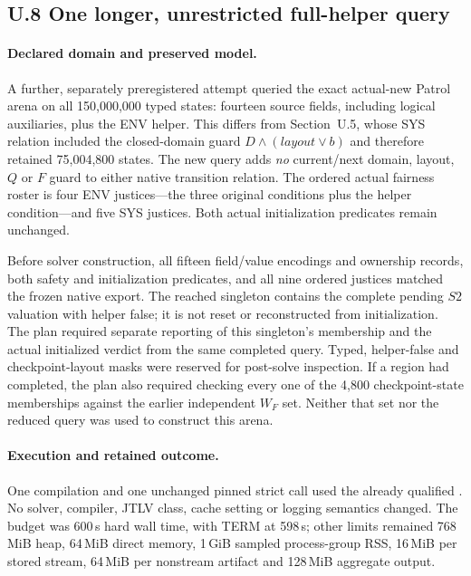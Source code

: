 \subsection*{U.8 One longer, unrestricted full-helper query}
\label{supp:native-full-helper-extended}

\paragraph{Declared domain and preserved model.}
A further, separately preregistered attempt queried the exact actual-new
Patrol arena on all 150,000,000 typed states: fourteen source fields,
including logical auxiliaries, plus the ENV helper. This differs from
Section~U.5, whose SYS relation included the closed-domain guard
$D\land(\mathit{layout}\lor b)$ and therefore retained 75,004,800 states.
The new query adds \emph{no} current/next domain, layout, $Q$ or $F$
guard to either native transition relation. The ordered actual fairness
roster is four ENV justices---the three original conditions plus the
helper condition---and five SYS justices. Both actual initialization
predicates remain unchanged.

Before solver construction, all fifteen field/value encodings and
ownership records, both safety and initialization predicates, and all
nine ordered justices matched the frozen native export. The reached
singleton contains the complete pending $S2$ valuation with helper false;
it is not reset or reconstructed from initialization. The plan required
separate reporting of this singleton's membership and the actual
initialized verdict from the same completed query. Typed, helper-false
and checkpoint-layout masks were reserved for post-solve inspection.
If a region had completed, the plan also required checking every one of
the 4,800 checkpoint-state memberships against the earlier independent
$W_F$ set. Neither that set nor the reduced query was used to construct
this arena.

\paragraph{Execution and retained outcome.}
One compilation and one unchanged pinned  strict call used
the already qualified . No solver,
compiler, JTLV class, cache setting or logging semantics changed.
The budget was 600\,s hard wall time, with TERM at 598\,s; other limits
remained 768\,MiB heap, 64\,MiB direct memory, 1\,GiB sampled
process-group RSS, 16\,MiB per stored stream, 64\,MiB per nonstream
artifact and 128\,MiB aggregate output.

